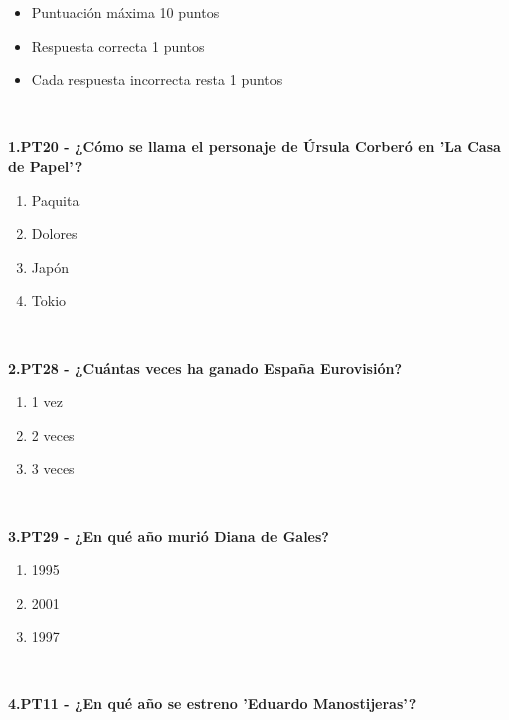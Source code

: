 \documentclass[12pt,a4paper,twoside]{article}
\begin{document}
        \begin{itemize}[left=1.5cm, itemsep=0.02em] 
            \item Puntuación máxima 10 puntos
            \item Respuesta correcta 1 puntos
            \item Cada respuesta incorrecta resta 1 puntos
        \end{itemize}
        \vspace{1\baselineskip}\\

        \noindent\parbox[t]{0.9\textwidth}{
		\textbf{
            \small
			1.PT20 - ¿Cómo se llama el personaje de Úrsula Corberó en 'La Casa de Papel'?
		}
		\begin{enumerate}[label=\Alph*., itemsep=0.02em]
			\small\item Paquita\small\item Dolores\small\item Japón\small\item Tokio
		\end{enumerate}
		}\vspace{1\baselineskip}\\\noindent\parbox[t]{0.9\textwidth}{
		\textbf{
            \small
			2.PT28 - ¿Cuántas veces ha ganado España Eurovisión?
		}
		\begin{enumerate}[label=\Alph*., itemsep=0.02em]
			\small\item 1 vez\small\item 2 veces\small\item 3 veces
		\end{enumerate}
		}\vspace{1\baselineskip}\\\noindent\parbox[t]{0.9\textwidth}{
		\textbf{
            \small
			3.PT29 - ¿En qué año murió Diana de Gales?
		}
		\begin{enumerate}[label=\Alph*., itemsep=0.02em]
			\small\item 1995\small\item 2001\small\item 1997
		\end{enumerate}
		}\vspace{1\baselineskip}\\\noindent\parbox[t]{0.9\textwidth}{
		\textbf{
            \small
			4.PT11 - ¿En qué año se estreno 'Eduardo Manostijeras'?
		}
		\begin{enumerate}[label=\Alph*., itemsep=0.02em]

\end{enumerate}}
\end{document}
